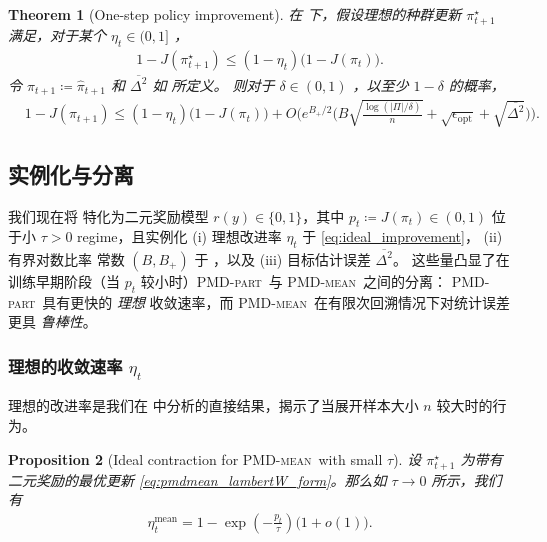 \documentclass{article}
\theoremstyle{plain}
\newtheorem{theorem}{Theorem}[section]
\newtheorem{proposition}[theorem]{Proposition}
\theoremstyle{definition}
\theoremstyle{remark}
\newcommand{\pmdmean}{\textsc{PMD-mean}}
\newcommand{\abs}[1]{\left|#1\right|}
\begin{document}
\begin{theorem}[One-step policy improvement]
    \label{cor:convergence_one_step}
    在  下，假设理想的种群更新 $\pi^\star_{t+1}$ 满足，对于某个 $\eta_t\in(0,1]$ ，
    \begin{align}
        1 - J(\pi^\star_{t+1})
        \leq
        (1-\eta_t)\big(1-J(\pi_t)\big).
        \label{eq:ideal_improvement}
    \end{align}
    令 $\pi_{t+1}\coloneqq\widehat{\pi}_{t+1}$ 和 $\overline{\Delta^2}$ 如  所定义。  
则对于 $\delta\in(0,1)$ ，以至少 $1-\delta$ 的概率，
    \begin{align}
        &1 - J(\pi_{t+1})
        \leq (1-\eta_t)\big(1-J(\pi_t)\big)+O\Big(e^{B_+/2}\Big(B\sqrt{\frac{\log(\abs{\Pi}/\delta)}{n}}+\sqrt{\epsilon_{\mathrm{opt}}}
        +\sqrt{\overline{\Delta^2}}\Big)\Big).
        \label{eq:one_step_improvement}
    \end{align}
\end{theorem}


\subsection{实例化与分离}
\label{sec:instantiate_eta_B}
我们现在将  特化为二元奖励模型 $r(y)\in\{0,1\}$，其中 $p_t \coloneqq J(\pi_t) \in (0,1)$ 位于小 $\tau>0$  regime，且实例化  
(i) {理想改进率} $\eta_t$ 于 \eqref{eq:ideal_improvement}，  
(ii) {有界对数比率} 常数 $(B,B_+)$ 于 ，以及  
(iii) {目标估计误差} $\overline{\Delta^2}$。  
这些量凸显了在训练早期阶段（当 $p_t$ 较小时）\textsc{PMD-part}\ 与 \textsc{PMD-mean}\ 之间的分离：  
\textsc{PMD-part}\ 具有更快的 \emph{理想} 收敛速率，而 \textsc{PMD-mean}\ 在有限次回溯情况下对统计误差更具 \emph{鲁棒性}。


\subsubsection{理想的收敛速率 $\eta_t$ }
\label{sec:eta_instantiation}
理想的改进率是我们在  中分析的直接结果，揭示了当展开样本大小 $n$ 较大时的行为。 
\begin{proposition}[Ideal contraction for \pmdmean\ with small $\tau$]
\label{prop:eta_mean_asymp}
    设 $\pi^\star_{t+1}$ 为带有二元奖励的最优更新 \eqref{eq:pmdmean_lambertW_form}。那么如 $\tau\to 0$ 所示，我们有
    \begin{align}
        \eta_t^{\mathrm{mean}}
        =1-\exp\left(-\frac{p_t}{\tau}\right)\big(1+o(1)\big).
        \label{eq:eta_mean_asymp}
    \end{align}
\end{proposition}
\end{document}
